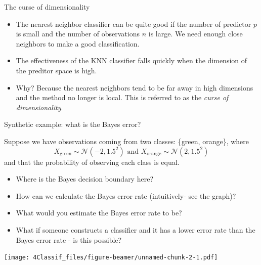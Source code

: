 \documentclass[10pt,ignorenonframetext,]{beamer}
\providecommand{\tightlist}{%
  \setlength{\itemsep}{0pt}\setlength{\parskip}{0pt}}
\begin{document}
\begin{frame}

\begin{block}{The curse of dimensionality}

\begin{itemize}
\item
  The nearest neighbor classifier can be quite good if the number of
  predictor \(p\) is small and the number of observations \(n\) is
  large. We need enough close neighbors to make a good classification.
\item
  The effectiveness of the KNN classifier falls quickly when the
  dimension of the preditor space is high.
\item
  Why? Because the nearest neighbors tend to be far away in high
  dimensions and the method no longer is local. This is referred to as
  the \emph{curse of dimensionality}.
\end{itemize}

\end{block}

\end{frame}

\begin{frame}

\begin{block}{Synthetic example: what is the Bayes error?}

Suppose we have observations coming from two classes: \{{green},
{orange}\}, where
\[X_{\text{green}}\sim \mathcal{N}(-2, 1.5^2) \text{ and }
X_{\text{orange}}\sim \mathcal{N}(2, 1.5^2) \] and that the probability
of observing each class is equal.

\begin{itemize}
\tightlist
\item
  Where is the Bayes decision boundary here?
\item
  How can we calculate the Bayes error rate (intuitively- see the
  graph)?
\item
  What would you estimate the Bayes error rate to be?
\item
  What if someone constructs a classifier and it has a lower error rate
  than the Bayes error rate - is this possible?
\end{itemize}

\end{block}

\end{frame}

\begin{frame}

\texttt{[image: 4Classif\_files/figure-beamer/unnamed-chunk-2-1.pdf]}

\end{frame}
\end{document}
